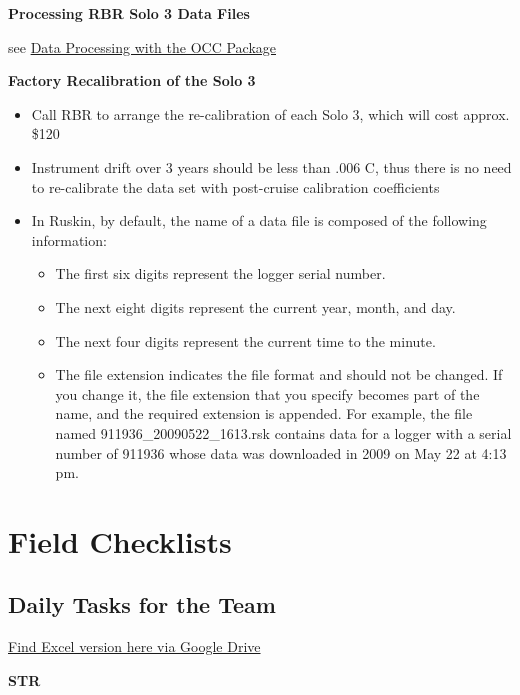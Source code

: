 \documentclass[]{book}
\providecommand{\tightlist}{%
  \setlength{\itemsep}{0pt}\setlength{\parskip}{0pt}}
\begin{document}
\textbf{Processing RBR Solo 3 Data Files}

see \protect\hyperlink{data_processing}{Data Processing with the OCC Package}

\textbf{Factory Recalibration of the Solo 3}

\begin{itemize}
\item
  Call RBR to arrange the re-calibration of each Solo 3, which will cost approx. \$120
\item
  Instrument drift over 3 years should be less than .006 C, thus there is no need to re-calibrate the data set with post-cruise calibration coefficients
\item
  In Ruskin, by default, the name of a data file is composed of the following information:

  \begin{itemize}
  \tightlist
  \item
    The first six digits represent the logger serial number.
  \item
    The next eight digits represent the current year, month, and day.
  \item
    The next four digits represent the current time to the minute.
  \item
    The file extension indicates the file format and should not be changed. If you change it, the file extension that you specify becomes part of the name, and the required extension is appended. For example, the file named 911936\_20090522\_1613.rsk contains data for a logger with a serial number of 911936 whose data was downloaded in 2009 on May 22 at 4:13 pm.
  \end{itemize}
\end{itemize}

\hypertarget{fc}{%
\chapter{Field Checklists}\label{fc}}

\hypertarget{daily-tasks-for-the-team}{%
\section{Daily Tasks for the Team}\label{daily-tasks-for-the-team}}

\href{https://drive.google.com/open?id=1I4Hojo0qjKtUwhRqgc9aLM6_fGtjqZMM}{Find Excel version here via Google Drive}

\textbf{STR}
\end{document}
